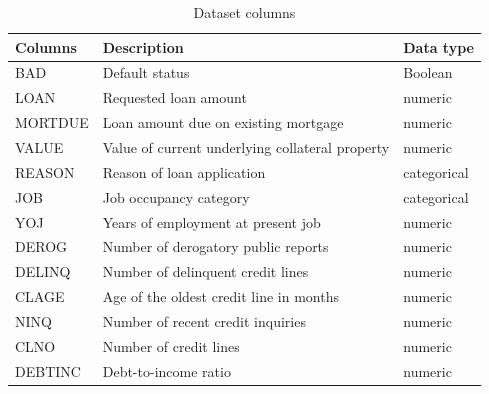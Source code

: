\begin{table}[H]
    \small
    \setlength{\tabcolsep}{8pt}
    \renewcommand{\arraystretch}{1.3}
    \begin{center}
        \caption[Dataset columns]{Dataset columns}\label{tab:dataset}
    \begin{tabular}{@{} l p{8cm} l @{}}
    \toprule
    \textbf{Columns} & \textbf{Description} & \textbf{Data type}\\
    \midrule
    \hline
    BAD & Default status & Boolean \\

    LOAN & Requested loan amount & numeric \\

    MORTDUE & Loan amount due on existing mortgage & numeric \\

    VALUE & Value of current underlying collateral property & numeric \\

    REASON & Reason of loan application & categorical \\
    JOB & Job occupancy category & categorical \\

    YOJ & Years of employment at present job & numeric \\

    DEROG & Number of derogatory public reports & numeric \\

    DELINQ & Number of delinquent credit lines & numeric \\

    CLAGE & Age of the oldest credit line in months & numeric \\

    NINQ & Number of recent credit inquiries & numeric \\

    CLNO & Number of credit lines & numeric \\

    DEBTINC & Debt-to-income ratio & numeric \\
    \hline
    \bottomrule
    \end{tabular}
    \end{center}
    \begin{center} %
    \end{center}
\end{table}

